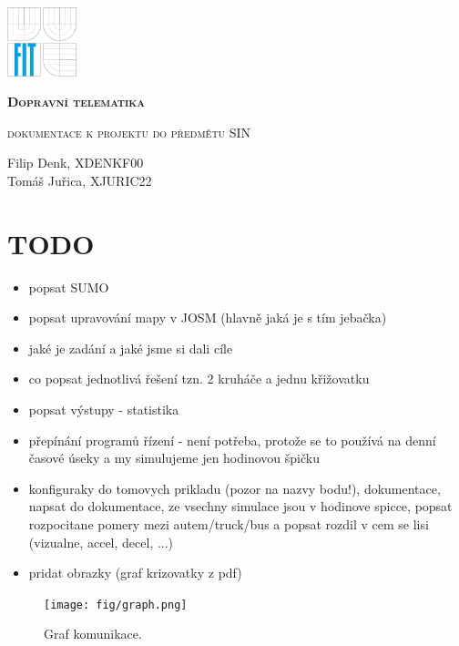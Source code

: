 \documentclass[a4paper,11pt]{article}
\begin{document}
\begin{titlepage}
	\centering
	\includegraphics[width=0.15\textwidth]{fig/fit-zp2.pdf}\par\vspace{7cm}
	{\scshape\LARGE\bfseries Dopravní telematika\par}
	\vspace{0.5cm}
	{\scshape\Large dokumentace k projektu do předmětu SIN \par}
	\vspace{1.5cm}
	{\huge\bfseries \par}
	\vspace{2cm}
	{\Large\itshape \par}
	\vspace{8cm}
	Filip Denk, XDENKF00
	\\Tomáš Juřica, XJURIC22
\end{titlepage}


\section{TODO}
\begin{itemize}
	\item popsat SUMO
	\item popsat upravování mapy v JOSM (hlavně jaká je s tím jebačka)
	\item jaké je zadání a jaké jsme si dali cíle
	\item co popsat jednotlivá řešení tzn. 2 kruháče a jednu křižovatku
	\item popsat výstupy - statistika
	\item přepínání programů řízení - není potřeba, protože se to používá na denní časové úseky a my simulujeme jen hodinovou špičku
	\item konfiguraky do tomovych prikladu (pozor na nazvy bodu!), dokumentace, napsat do dokumentace, ze vsechny simulace jsou v hodinove spicce, popsat rozpocitane pomery mezi autem/truck/bus a popsat rozdil v cem se lisi (vizualne, accel, decel, ...)
	\item pridat obrazky (graf krizovatky z pdf)
\end{itemize}

\iffalse
\begin{figure}[!h]
	\centering
	\texttt{[image: fig/graph.png]}
	\caption{Graf komunikace.}
	\label{fig:marker}
\end{figure}
\end{document}
